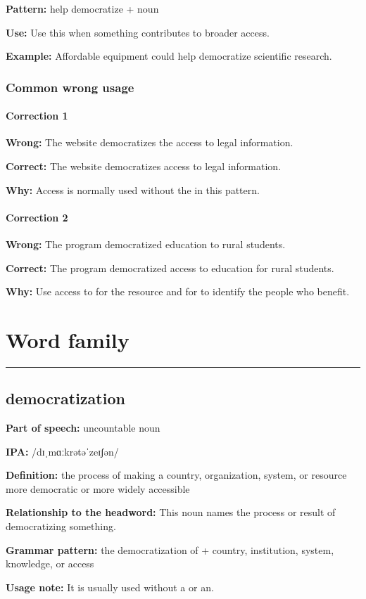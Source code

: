 \documentclass[11pt]{article}
\newcommand{\sectionrule}{\par\vspace{-0.5em}\noindent\textcolor{Accent}{\rule{\linewidth}{0.6pt}}\par}
\begin{document}
\textbf{Pattern:} help democratize + noun

\textbf{Use:} Use this when something contributes to broader access.

\textbf{Example:} Affordable equipment could help democratize scientific research.

\subsubsection{Common wrong usage}
\paragraph{Correction 1}
\textbf{Wrong:} The website democratizes the access to legal information.

\textbf{Correct:} The website democratizes access to legal information.

\textbf{Why:} Access is normally used without the in this pattern.

\paragraph{Correction 2}
\textbf{Wrong:} The program democratized education to rural students.

\textbf{Correct:} The program democratized access to education for rural students.

\textbf{Why:} Use access to for the resource and for to identify the people who benefit.

\section{Word family}
\sectionrule
\subsection{democratization}
\textbf{Part of speech:} uncountable noun

\textbf{IPA:} /dɪˌmɑːkrətəˈzeɪʃən/

\textbf{Definition:} the process of making a country, organization, system, or resource more democratic or more widely accessible

\textbf{Relationship to the headword:} This noun names the process or result of democratizing something.

\textbf{Grammar pattern:} the democratization of + country, institution, system, knowledge, or access

\textbf{Usage note:} It is usually used without a or an.
\end{document}
